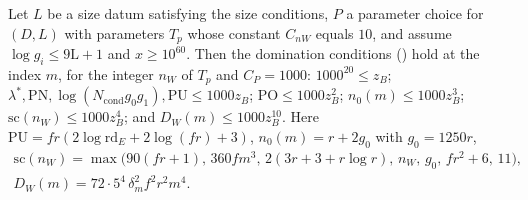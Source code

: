 \begin{proposition}\label{pf:onto1:domAt}
Let $L$ be a size datum satisfying the size conditions, $P$ a parameter choice for $(D,L)$ with parameters $T_p$ whose
constant $C_{nW}$ equals $10$, and assume $\log g_i\le9\mathrm L+1$ and $x\ge10^{60}$. Then the domination conditions
() hold at the index $m$, for the integer $n_W$ of $T_p$ and $C_P=1000$:
$1000^{20}\le z_B$; $\lambda^*,\mathrm{PN},\log(N_{\mathrm{cond}}g_0g_1),\mathrm{PU}\le1000z_B$; $\mathrm{PO}\le1000z_B^2$;
$n_0(m)\le1000z_B^3$; $\mathrm{sc}(n_W)\le1000z_B^4$; and $D_W(m)\le1000z_B^{10}$. Here $\mathrm{PU}=fr(2\log\mathrm{rd}_E+2\log(fr)+3)$,
$n_0(m)=r+2g_0$ with $g_0=1250r$,
\begin{gather*}
\mathrm{sc}(n_W)=\max\bigl(90(fr+1),\,360fm^3,\,2(3r+3+r\log r),\,n_W,\,g_0,\,fr^2+6,\,11\bigr),\\
D_W(m)=72\cdot5^4\,\delta_m^2f^2r^2m^4 .
\end{gather*}
\end{proposition}


